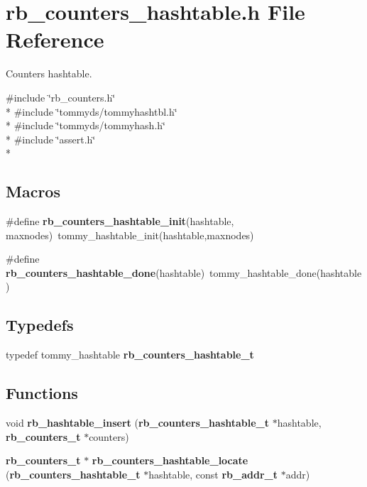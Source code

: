 \section{rb\+\_\+counters\+\_\+hashtable.\+h File Reference}
\label{rb__counters__hashtable_8h}


Counters hashtable.  


{\ttfamily \#include \char`\"{}rb\+\_\+counters.\+h\char`\"{}}\\*
{\ttfamily \#include \char`\"{}tommyds/tommyhashtbl.\+h\char`\"{}}\\*
{\ttfamily \#include \char`\"{}tommyds/tommyhash.\+h\char`\"{}}\\*
{\ttfamily \#include \char`\"{}assert.\+h\char`\"{}}\\*
\subsection*{Macros}
\begin{DoxyCompactItemize}
\item 
\#define {\bf rb\+\_\+counters\+\_\+hashtable\+\_\+init}(hashtable, maxnodes)~tommy\+\_\+hashtable\+\_\+init(hashtable,maxnodes)
\item 
\#define {\bf rb\+\_\+counters\+\_\+hashtable\+\_\+done}(hashtable)~tommy\+\_\+hashtable\+\_\+done(hashtable)
\end{DoxyCompactItemize}
\subsection*{Typedefs}
\begin{DoxyCompactItemize}
\item 
typedef tommy\+\_\+hashtable {\bf rb\+\_\+counters\+\_\+hashtable\+\_\+t}
\end{DoxyCompactItemize}
\subsection*{Functions}
\begin{DoxyCompactItemize}
\item 
void {\bf rb\+\_\+hashtable\+\_\+insert} ({\bf rb\+\_\+counters\+\_\+hashtable\+\_\+t} $\ast$hashtable, {\bf rb\+\_\+counters\+\_\+t} $\ast$counters)
\item 
{\bf rb\+\_\+counters\+\_\+t} $\ast$ {\bf rb\+\_\+counters\+\_\+hashtable\+\_\+locate} ({\bf rb\+\_\+counters\+\_\+hashtable\+\_\+t} $\ast$hashtable, const {\bf rb\+\_\+addr\+\_\+t} $\ast$addr)
\end{DoxyCompactItemize}


